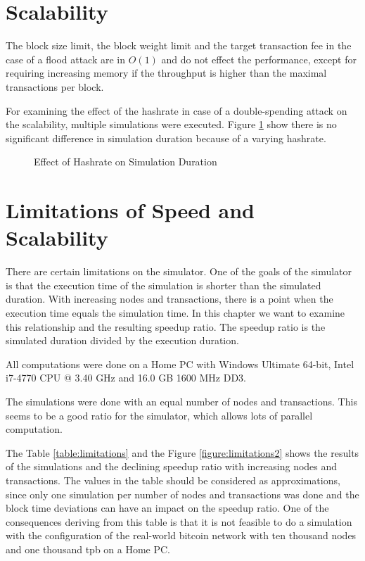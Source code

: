 \section{Scalability}
The block size limit, the block weight limit and the target transaction fee in the case of a flood attack are in $O(1)$ and do not effect the performance, except for requiring increasing memory if the throughput is higher than the maximal transactions per block.

For examining the effect of the hashrate in case of a double-spending attack on the scalability, multiple simulations were executed. Figure \ref{figure:limitations} show there is no significant difference in simulation duration because of a varying hashrate.

\begin{figure}
\centering
{}
\caption{Effect of Hashrate on Simulation Duration\label{figure:limitations}}
\end{figure}

\section{Limitations of Speed and Scalability}
There are certain limitations on the simulator. One of the goals of the simulator is that the execution time of the simulation is shorter than the simulated duration. With increasing nodes and transactions, there is a point when the execution time equals the simulation time. In this chapter we want to examine this relationship and the resulting speedup ratio. The speedup ratio is the simulated duration divided by the execution duration.

All computations were done on a Home PC with Windows Ultimate 64-bit, Intel i7-4770 CPU @ 3.40 GHz and 16.0 GB 1600 MHz DD3.

The simulations were done with an equal number of nodes and transactions. This seems to be a good ratio for the simulator, which allows lots of parallel computation. 

The Table \ref{table:limitations} and the Figure \ref{figure:limitations2} shows the results of the simulations and the declining speedup ratio with increasing nodes and transactions. The values in the table should be considered as approximations, since only one simulation per number of nodes and transactions was done and the block time deviations can have an impact on the speedup ratio. One of the consequences deriving from this table is that it is not feasible to do a simulation with the configuration of the real-world bitcoin network with ten thousand nodes and one thousand tpb on a Home PC.

